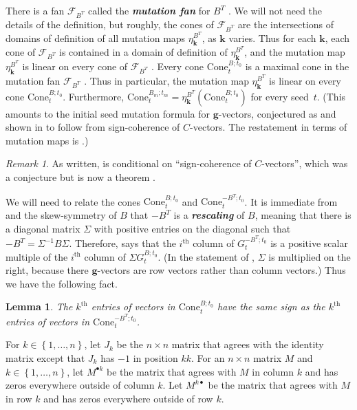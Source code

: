 \documentclass{amsart}
\newtheorem{lemma}[proposition]{Lemma}
\theoremstyle{definition}
\theoremstyle{remark}
\newtheorem{remark}[proposition]{Remark}
\numberwithin{equation}{section}
\newcommand{\newword}[1]{\textbf{\emph{#1}}}
\newcommand{\set}[1]{{\left\lbrace #1 \right\rbrace}}
\newcommand{\F}{{\mathcal F}}
\renewcommand{\th}{^\text{th}}
\newcommand{\0}{{\mathbf{0}}}
\newcommand{\Cone}{\mathrm{Cone}}
\newcommand{\g}{\mathbf{g}}
\newcommand{\kk}{\mathbf{k}}
\renewcommand{\th}{^\text{th}}
\begin{document}
There is a fan $\F_{B^T}$ called the \newword{mutation fan} for $B^T$ \cite[Definition~5.12]{universal}.
We will not need the details of the definition, but roughly, the cones of $\F_{B^T}$ are the intersections of domains of definition of all mutation maps $\eta_\kk^{B^T}$, as $\kk$ varies.
Thus for each $\kk$, each cone of $\F_{B^T}$ is contained in a domain of definition of $\eta_\kk^{B^T}$, and the mutation map $\eta_\kk^{B^T}$ is linear on every cone of $\F_{B^T}$ \cite[Proposition~5.3]{universal}.
Every cone $\Cone^{B;t_0}_t$ is a maximal cone in the mutation fan $\F_{B^T}$ \cite[Proposition~8.13]{universal}.
Thus in particular, the mutation map $\eta_\kk^{B^T}$ is linear on every cone $\Cone^{B;t_0}_t$.
Furthermore, $\Cone_t^{B_m;t_m}=\eta_\kk^{B^T}\left(\Cone_t^{B;t_0}\right)$ for every seed~$t$.
(This amounts to the initial seed mutation formula for $\g$-vectors, conjectured as \cite[Conjecture~7.12]{FZ07} and shown in \cite[Proposition~4.2(v)]{NZ12} to follow from sign-coherence of $C$-vectors.
The restatement in terms of mutation maps is \cite[Conjecture~8.11]{universal}.)

\begin{remark}\label{conditional}
As written, \cite[Proposition~8.13]{universal} is conditional on ``sign-coherence of $C$-vectors'', which was a conjecture but is now a theorem \cite[Corollary~5.5]{GHKK18}.
\end{remark}

We will need to relate the cones $\Cone^{B;t_0}_t$ and $\Cone^{-B^T;t_0}_t$.
It is immediate from \cite[Proposition~7.5]{universal} and the skew-symmetry of $B$ that $-B^T$ is a \newword{rescaling} of $B$, meaning that there is a diagonal matrix $\Sigma$ with positive entries on the diagonal such that $-B^T=\Sigma^{-1}B\Sigma$.
Therefore, \cite[Proposition~8.20]{universal} says that the $i\th$ column of $G_t^{-B^T;t_0}$ is a positive scalar multiple of the $i\th$ column of $\Sigma G_t^{B;t_0}$.
(In the statement of \cite[Proposition~8.20]{universal}, $\Sigma$ is multiplied on the right, because there $\g$-vectors are row vectors rather than column vectors.)
Thus we have the following fact.
\begin{lemma}\label{B or -BT}
The $k\th$ entries of vectors in $\Cone^{B;t_0}_t$ have the same sign as the $k\th$ entries of vectors in $\Cone^{-B^T;t_0}_t$.
\end{lemma}

For $k\in\set{1,\ldots,n}$, let $J_k$ be the $n\times n$ matrix that agrees with the identity matrix except that $J_k$ has $-1$ in position $kk$.
For an $n\times n$ matrix $M$ and $k\in\set{1,\ldots,n}$, let $M^{\bullet k}$ be the matrix that agrees with $M$ in column $k$ and has zeros everywhere outside of column $k$.
Let $M^{k\bullet}$ be the matrix that agrees with $M$ in row $k$ and has zeros everywhere outside of row $k$.
\end{document}
